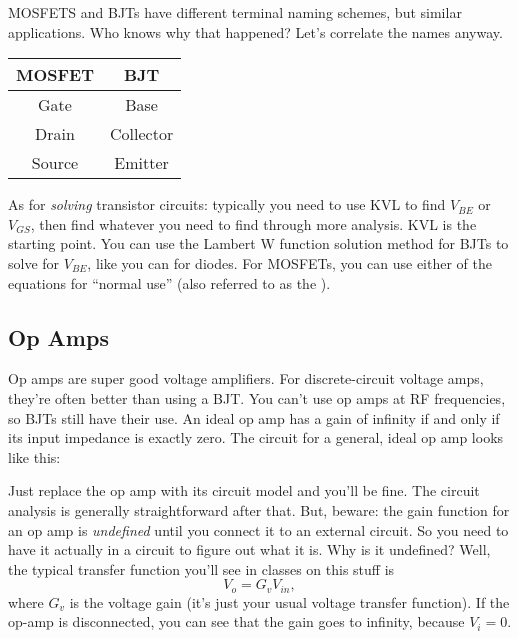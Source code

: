 MOSFETS and BJTs have different terminal naming schemes, but similar applications. Who knows why that happened? Let's correlate the names anyway.

\begin{center}
  \begin{tabular}{|c|c|}
    \hline
  MOSFET & BJT \\
  \hline
  Gate & Base \\
  Drain & Collector \\
    Source & Emitter \\
    \hline
\end{tabular}
\end{center}

As for \textit{solving} transistor circuits: typically you need to use KVL to find $V_{BE}$ or $V_{GS}$, then find whatever you need to find through more analysis. KVL is the starting point. You can use the Lambert W function solution method for BJTs to solve for $V_{BE}$, like you can for diodes. For MOSFETs, you can use either of the equations for ``normal use'' (also referred to as the ).
\subsection{Op Amps}
Op amps are super good voltage amplifiers. For discrete-circuit voltage amps, they're often better than using a BJT. You can't use op amps at RF frequencies, so BJTs still have their use. An ideal op amp has a gain of infinity if and only if its input impedance is exactly zero.
The circuit for a general, ideal op amp looks like this:

Just replace the op amp with its circuit model and you'll be fine. The circuit analysis is generally straightforward after that. But, beware: the gain function for an op amp is \textit{undefined} until you connect it to an external circuit. So you need to have it actually in a circuit to figure out what it is. Why is it undefined? Well, the typical transfer function you'll see in classes on this stuff is
\begin{equation}
\label{eq:1.46}
V_{o} = G_{v} V_{in},
\end{equation}
where $G_{v}$ is the voltage gain (it's just your usual voltage transfer function). If the op-amp is disconnected, you can see that the gain goes to infinity, because $V_{i} = 0$. 
